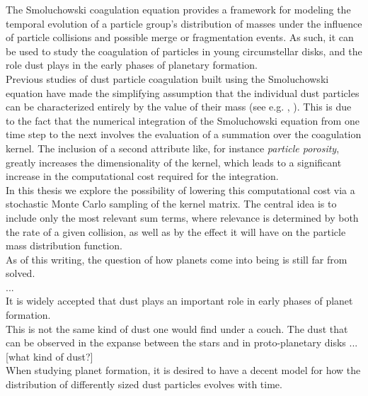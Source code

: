
The Smoluchowski coagulation equation provides a framework for modeling the temporal evolution of 
a particle group's distribution of masses under the influence of particle collisions and 
possible merge or fragmentation events. 
As such, it can be used to study the coagulation of particles in young circumstellar disks,
and the role dust plays in the early phases of planetary formation. \\

Previous studies of dust particle coagulation built using the Smoluchowski equation have made the 
simplifying assumption that the individual dust particles can be characterized entirely by the 
value of their mass (see e.g. 
    \cite{birnstiel_dullemond_brauer_2010}, 
    \cite{dullemond_dominik_2004}). 
This is due to the fact that the numerical integration of the Smoluchowski equation from one 
time step to the next involves the evaluation of a summation over the coagulation kernel. 
The inclusion of a second attribute like, for instance \textit{particle porosity}, greatly 
increases the dimensionality of the kernel, which leads to a significant increase in the 
computational cost required for the integration. \\

In this thesis we explore the possibility of lowering this computational cost via a stochastic 
Monte Carlo sampling of the kernel matrix. The central idea is to include only the most 
relevant sum terms, where relevance is determined by both the rate of a given collision,  
as well as by the effect it will have on the particle mass distribution function. \\

As of this writing, the question of how planets come into being is still far from solved. \\

... \\

It is widely accepted that dust plays an important role in early phases of planet formation. \\

This is not the same kind of dust one would find under a couch.
The dust that can be observed in the expanse between the stars 
and in proto-planetary disks ... [what kind of dust?] \\

When studying planet formation, it is desired to have 
a decent model for how the distribution of differently 
sized dust particles evolves with time. \\

